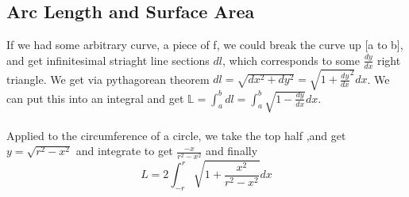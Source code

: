 \documentclass[twocolumn, 12pt]{report}
\begin{document}
\subsection{Arc Length and Surface Area}
If we had some arbitrary curve, a piece of f, we could break the curve up [a to b], and get infinitesimal striaght line sections $dl$, which corresponds to some $\frac{dy}{dx}$ right triangle. We get via pythagorean theorem $dl = \sqrt{dx^2 + dy^2} = \sqrt{1 + \frac{dy}{dx}^2} dx$. We can put this into an integral and get $\mathbb{L} = \int_a^b dl = \int_a^b \sqrt {1-\frac{dy}{dx}} dx $. \\\\
Applied to the circumference of a circle, we take the top half ,and get $y = \sqrt{r^2 - x^2}$ and integrate to get $\frac{-x}{r^2 - x^2}$ and finally $$L  = 2 \int_{-r}^r \sqrt{1 + \frac{x^2}{r^2-x^2}} dx$$
\end{document}
